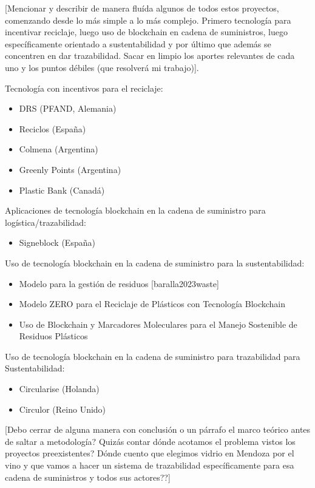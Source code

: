 [Mencionar y describir de manera fluída algunos de todos estos proyectos, comenzando desde lo más simple a lo más complejo. Primero tecnología para incentivar reciclaje, luego uso de blockchain en cadena de suministros, luego específicamente orientado a sustentabilidad y por último que además se concentren en dar trazabilidad. Sacar en limpio los aportes relevantes de cada uno y los puntos débiles (que resolverá mi trabajo)].

Tecnología con incentivos para el reciclaje:
\begin{itemize}
    \item DRS (PFAND, Alemania)
    \item Reciclos (España)
    \item Colmena (Argentina)
    \item Greenly Points (Argentina)
    \item Plastic Bank (Canadá)
\end{itemize}

Aplicaciones de tecnología blockchain en la cadena de suministro para logística/trazabilidad:
\begin{itemize}
    \item Signeblock (España)
\end{itemize}

Uso de tecnología blockchain en la cadena de suministro para la sustentabilidad:
\begin{itemize}
    \item Modelo para la gestión de residuos [baralla2023waste]
    \item Modelo ZERO para el Reciclaje de Plásticos con Tecnología Blockchain
    \item Uso de Blockchain y Marcadores Moleculares para el Manejo Sostenible de Residuos Plásticos
\end{itemize}

Uso de tecnología blockchain en la cadena de suministro para trazabilidad para Sustentabilidad:
\begin{itemize}
    \item Circularise (Holanda)
    \item Circulor (Reino Unido)
\end{itemize}

[Debo cerrar de alguna manera con conclusión o un párrafo el marco teórico antes de saltar a metodología? Quizás contar dónde acotamos el problema vistos los proyectos preexistentes? Dónde cuento que elegimos vidrio en Mendoza por el vino y que vamos a hacer un sistema de trazabilidad específicamente para esa cadena de suministros y todos sus actores??]
